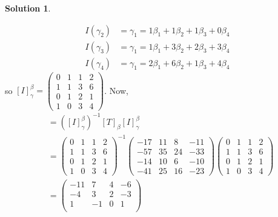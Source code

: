 \documentclass[10pt]{article}
\theoremstyle{definition}
\newtheorem{soln}{Solution}
\begin{document}
\begin{soln}
\begin{enumerate}[label=(\alph*)]
\begin{align*}
            I(\gamma_2) & =\gamma_1=1\beta_1+1\beta_2+1\beta_3+0\beta_4 \\
            I(\gamma_3) & =\gamma_1=1\beta_1+3\beta_2+2\beta_3+3\beta_4 \\
            I(\gamma_4) & =\gamma_1=2\beta_1+6\beta_2+1\beta_3+4\beta_4
          \end{align*}
          so $\left[I\right]_\gamma^\beta=\begin{pmatrix}
              0 & 1 & 1 & 2 \\
              1 & 1 & 3 & 6 \\
              0 & 1 & 2 & 1 \\
              1 & 0 & 3 & 4
            \end{pmatrix}$. Now,
          \begin{align*}
             & = \left(\left[I\right]_\gamma^\beta\right)^{-1}\left[T\right]_\beta\left[I\right]_\gamma^\beta \\
             & = \begin{pmatrix}
                   0 & 1 & 1 & 2 \\
                   1 & 1 & 3 & 6 \\
                   0 & 1 & 2 & 1 \\
                   1 & 0 & 3 & 4
                 \end{pmatrix}^{-1}
            \begin{pmatrix}
              -17 & 11 & 8  & -11 \\
              -57 & 35 & 24 & -33 \\
              -14 & 10 & 6  & -10 \\
              -41 & 25 & 16 & -23
            \end{pmatrix}
            \begin{pmatrix}
              0 & 1 & 1 & 2 \\
              1 & 1 & 3 & 6 \\
              0 & 1 & 2 & 1 \\
              1 & 0 & 3 & 4
            \end{pmatrix}                                                                                    \\
             & =
            \begin{pmatrix}
              -11 & 7  & 4  & -6 \\
              -4  & 3  & 2  & -3 \\
              1   & -1 & 0  & 1  \\

\end{pmatrix}
\end{align*}
\end{enumerate}
\end{soln}
\end{document}
